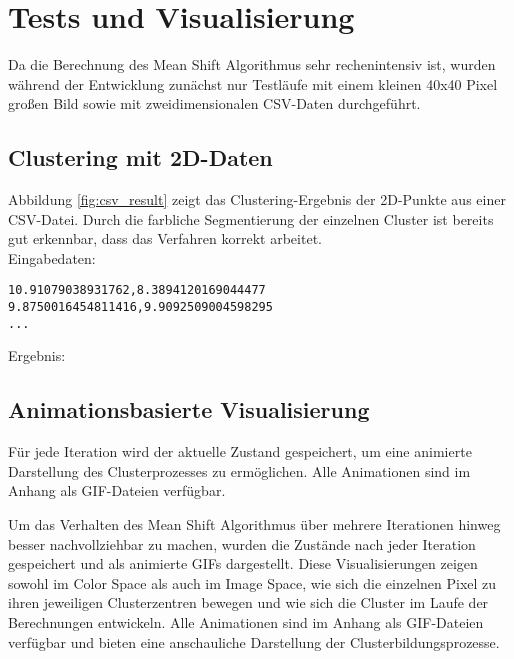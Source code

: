 \section{Tests und Visualisierung}

Da die Berechnung des Mean Shift Algorithmus sehr rechenintensiv ist, wurden während der Entwicklung zunächst nur Testläufe mit einem kleinen 40x40 Pixel großen Bild sowie mit zweidimensionalen CSV-Daten durchgeführt.

\subsection*{Clustering mit 2D-Daten}

Abbildung \ref{fig:csv_result} zeigt das Clustering-Ergebnis der 2D-Punkte aus einer CSV-Datei. Durch die farbliche Segmentierung der einzelnen Cluster ist bereits gut erkennbar, dass das Verfahren korrekt arbeitet. \\

\noindent
Eingabedaten:
\begin{verbatim}
10.91079038931762,8.3894120169044477
9.8750016454811416,9.9092509004598295
...
\end{verbatim}

\noindent
Ergebnis: 

\newpage

\subsection*{Animationsbasierte Visualisierung}

Für jede Iteration wird der aktuelle Zustand gespeichert, um eine animierte Darstellung des Clusterprozesses zu ermöglichen. Alle Animationen sind im Anhang als GIF-Dateien verfügbar.

Um das Verhalten des Mean Shift Algorithmus über mehrere Iterationen hinweg besser nachvollziehbar zu machen, wurden die Zustände nach jeder Iteration gespeichert und als animierte GIFs dargestellt. Diese Visualisierungen zeigen sowohl im Color Space als auch im Image Space, wie sich die einzelnen Pixel zu ihren jeweiligen Clusterzentren bewegen und wie sich die Cluster im Laufe der Berechnungen entwickeln. Alle Animationen sind im Anhang als GIF-Dateien verfügbar und bieten eine anschauliche Darstellung der Clusterbildungsprozesse.

